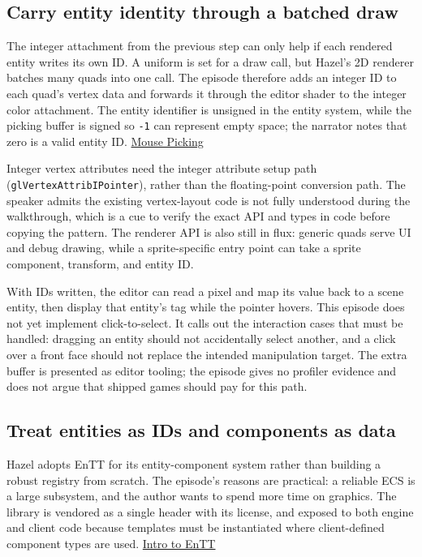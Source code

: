 \subsection{Carry entity identity through a batched draw}\label{06-engine-ii-ch031-carry-entity-identity-through-a-batched-draw}

The integer attachment from the previous step can only help if each rendered entity writes its own ID. A uniform is set for a draw call, but Hazel's 2D renderer batches many quads into one call. The episode therefore adds an integer ID to each quad's vertex data and forwards it through the editor shader to the integer color attachment. The entity identifier is unsigned in the entity system, while the picking buffer is signed so \texttt{-1} can represent empty space; the narrator notes that zero is a valid entity ID. \href{https://www.youtube.com/watch?v=GKERbQ7Sqyg}{Mouse Picking}

Integer vertex attributes need the integer attribute setup path (\texttt{glVertexAttribIPointer}), rather than the floating-point conversion path. The speaker admits the existing vertex-layout code is not fully understood during the walkthrough, which is a cue to verify the exact API and types in code before copying the pattern. The renderer API is also still in flux: generic quads serve UI and debug drawing, while a sprite-specific entry point can take a sprite component, transform, and entity ID.

With IDs written, the editor can read a pixel and map its value back to a scene entity, then display that entity's tag while the pointer hovers. This episode does not yet implement click-to-select. It calls out the interaction cases that must be handled: dragging an entity should not accidentally select another, and a click over a front face should not replace the intended manipulation target. The extra buffer is presented as editor tooling; the episode gives no profiler evidence and does not argue that shipped games should pay for this path.

\subsection{Treat entities as IDs and components as data}\label{06-engine-ii-ch031-treat-entities-as-ids-and-components-as-data}

Hazel adopts EnTT for its entity-component system rather than building a robust registry from scratch. The episode's reasons are practical: a reliable ECS is a large subsystem, and the author wants to spend more time on graphics. The library is vendored as a single header with its license, and exposed to both engine and client code because templates must be instantiated where client-defined component types are used. \href{https://www.youtube.com/watch?v=D4hz0wEB978}{Intro to EnTT}

